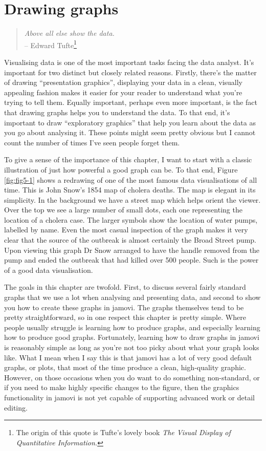 \documentclass[
]{book}
\begin{document}
\hypertarget{drawing-graphs}{%
\chapter{Drawing graphs}\label{drawing-graphs}}

\begin{quote}
\emph{Above all else show the data.}\\
-- Edward Tufte\footnote{The origin of this quote is Tufte's lovely book \emph{The Visual Display of Quantitative Information.}}
\end{quote}

Visualising data is one of the most important tasks facing the data analyst. It's important for two distinct but closely related reasons. Firstly, there's the matter of drawing ``presentation graphics'', displaying your data in a clean, visually appealing fashion makes it easier for your reader to understand what you're trying to tell them. Equally important, perhaps even more important, is the fact that drawing graphs helps you to understand the data. To that end, it's important to draw ``exploratory graphics'' that help you learn about the data as you go about analysing it. These points might seem pretty obvious but I cannot count the number of times I've seen people forget them.

To give a sense of the importance of this chapter, I want to start with a classic illustration of just how powerful a good graph can be. To that end, Figure \ref{fig:fig5-1} shows a redrawing of one of the most famous data visualisations of all time. This is John Snow's 1854 map of cholera deaths. The map is elegant in its simplicity. In the background we have a street map which helps orient the viewer. Over the top we see a large number of small dots, each one representing the location of a cholera case. The larger symbols show the location of water pumps, labelled by name. Even the most casual inspection of the graph makes it very clear that the source of the outbreak is almost certainly the Broad Street pump. Upon viewing this graph Dr Snow arranged to have the handle removed from the pump and ended the outbreak that had killed over 500 people. Such is the power of a good data visualisation.

The goals in this chapter are twofold. First, to discuss several fairly standard graphs that we use a lot when analysing and presenting data, and second to show you how to create these graphs in jamovi. The graphs themselves tend to be pretty straightforward, so in one respect this chapter is pretty simple. Where people usually struggle is learning how to produce graphs, and especially learning how to produce good graphs. Fortunately, learning how to draw graphs in jamovi is reasonably simple as long as you're not too picky about what your graph looks like. What I mean when I say this is that jamovi has a lot of very good default graphs, or plots, that most of the time produce a clean, high-quality graphic. However, on those occasions when you do want to do something non-standard, or if you need to make highly specific changes to the figure, then the graphics functionality in jamovi is not yet capable of supporting advanced work or detail editing.
\end{document}
